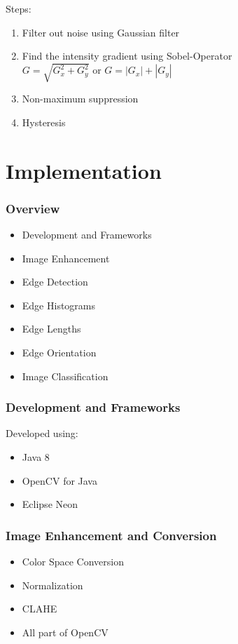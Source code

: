 \documentclass{beamer}
\begin{document}
\begin{frame}
	\begin{block}{Steps:}
		\begin{enumerate}
			\item Filter out noise using Gaussian filter
			\item Find the intensity gradient using Sobel-Operator\\
			$G = \sqrt{G_x^2 + G_y^2}$ or  $G = |G_x| + |G_y|$
			\item Non-maximum suppression
			\item Hysteresis
		\end{enumerate}
	\end{block}
\end{frame}


\section{Implementation}

\begin{frame}
	\frametitle{Overview}
	\begin{itemize}
		\item Development and Frameworks
		\item Image Enhancement
		\item Edge Detection
		\item Edge Histograms
		\item Edge Lengths
		\item Edge Orientation
		\item Image Classification
	\end{itemize}
\end{frame}


\begin{frame}
	\frametitle{Development and Frameworks}
	Developed using:
	\begin{itemize}
		\item Java 8
		\item OpenCV for Java
		\item Eclipse Neon
	\end{itemize}
	
\end{frame}

\begin{frame}
	\frametitle{Image Enhancement and Conversion}
	\begin{block}{}
		\begin{itemize}
			\item Color Space Conversion
			\item Normalization
			\item CLAHE
			\item All part of OpenCV
		\end{itemize}
	\end{block}
	
\end{frame}
\end{document}
